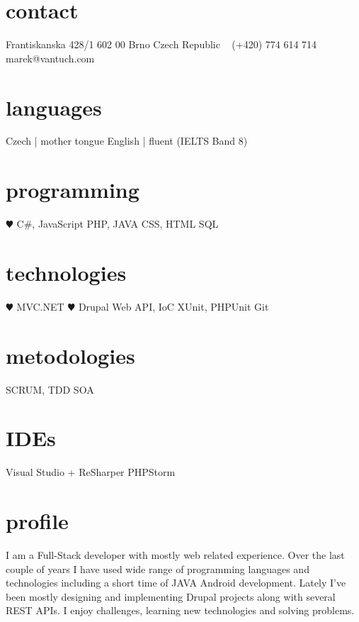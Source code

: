 \documentclass[]{friggeri-cv} %
\begin{document}


\begin{aside} %
\section{contact}
Frantiskanska 428/1
602 00 Brno
Czech Republic
~
(+420) 774 614 714
~
marek@vantuch.com
\section{languages}
Czech | mother tongue
English | fluent
(IELTS Band 8)
\section{programming}
{\color{red} $\varheartsuit$} C\#, JavaScript
PHP, JAVA
CSS, HTML
SQL
\section{technologies}
{\color{red} $\varheartsuit$} MVC.NET {\color{red} $\varheartsuit$} Drupal
Web API, IoC
XUnit, PHPUnit
Git
\section{metodologies}
SCRUM, TDD
SOA
\section{IDEs}
Visual Studio + ReSharper
PHPStorm
\end{aside}

\section{profile}
I am a Full-Stack developer with mostly web related experience.
Over the last couple of years I have used wide range of programming languages and technologies including a short time of JAVA Android development.
Lately I've been mostly designing and implementing Drupal projects along with several REST APIs.
I enjoy challenges, learning new technologies and solving problems.
\end{document}
